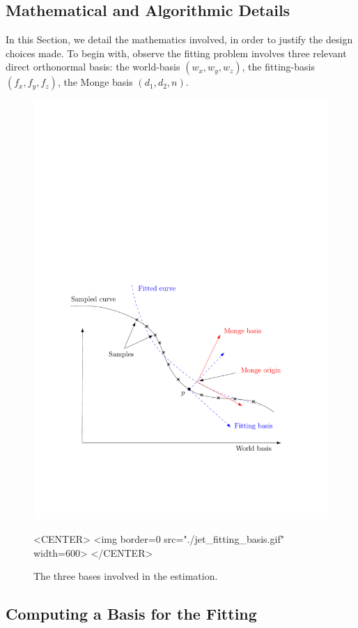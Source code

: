   
 \begin{ccAdvanced} 
\section{Mathematical and Algorithmic Details}
\label{sec:details}
In this Section, we detail the mathematics involved, in order to
justify the design choices made.
To begin with, observe the fitting problem involves three relevant
direct orthonormal basis: the world-basis $(w_x,w_y,w_z)$, the
fitting-basis $(f_x,f_y,f_z)$, the Monge basis $(d_1,d_2,n)$.

\begin{figure}[!ht]
\begin{ccTexOnly}
\centerline{
\includegraphics[width=.5\linewidth]{Jet_fitting_3/jet_fitting_basis}}
\end{ccTexOnly}

\label{fig:jet_fitting_basis}
\caption{The three bases involved in the estimation.}

\begin{ccHtmlOnly}
<CENTER>
<img border=0 src="./jet_fitting_basis.gif" width=600>
</CENTER>
\end{ccHtmlOnly}
\end{figure}

\subsection{Computing a Basis for the Fitting}


\end{ccAdvanced}
